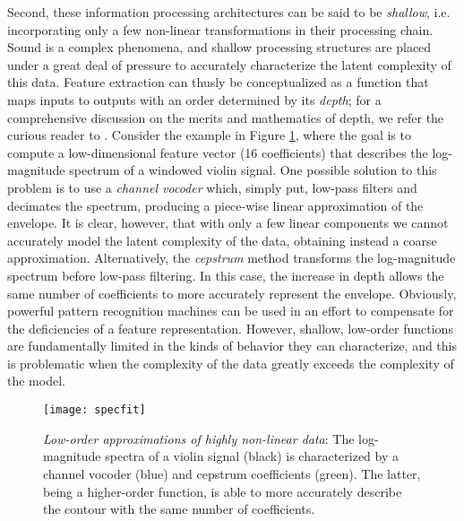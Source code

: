 Second, these information processing architectures can be said to be \emph{shallow}, i.e. incorporating only a few non-linear transformations in their processing chain.
Sound is a complex phenomena, and shallow processing structures are placed under a great deal of pressure to accurately characterize the latent complexity of this data.
Feature extraction can thusly be conceptualized as a function that maps inputs to outputs with an order determined by its \emph{depth}; for a comprehensive discussion on the merits and mathematics of depth, we refer the curious reader to \cite{Bengio2009Learning}.
Consider the example in Figure \ref{fig:curvefit}, where the goal is to compute a low-dimensional feature vector (16 coefficients) that describes the log-magnitude spectrum of a windowed violin signal.
One possible solution to this problem is to use a \emph{channel vocoder} which, simply put, low-pass filters and decimates the spectrum, producing a piece-wise linear approximation of the envelope.
It is clear, however, that with only a few linear components we cannot accurately model the latent complexity of the data, obtaining instead a coarse approximation.
Alternatively, the \emph{cepstrum} method transforms the log-magnitude spectrum before low-pass filtering.
In this case, the increase in depth allows the same number of coefficients to more accurately represent the envelope.
Obviously, powerful pattern recognition machines can be used in an effort to compensate for the deficiencies of a feature representation.
However, shallow, low-order functions are fundamentally limited in the kinds of behavior they can characterize, and this is problematic when the complexity of the data greatly exceeds the complexity of the model.

\begin{figure}[t]
\begin{centering}
\texttt{[image: specfit]}
\caption{\emph{Low-order approximations of highly non-linear data}: The log-magnitude spectra of a violin signal (black) is characterized by a channel vocoder (blue) and cepstrum coefficients (green). The latter, being a higher-order function, is able to more accurately describe the contour with the same number of coefficients.}
\label{fig:curvefit}
\end{centering}
\end{figure}

